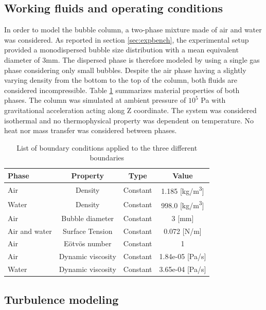 \documentclass[11pt,a4paper]{article}
\begin{document}
\subsection{Working fluids and operating conditions}
\label{sub:fluids}
In order to model the bubble column, a two-phase mixture made of air and water was considered. As reported in section \ref{sec:expbench}, the experimental setup provided a monodispersed bubble size distribution with a mean equivalent diameter of 3mm. The dispersed phase is therefore modeled by using a single gas phase considering only small bubbles. Despite the air phase having a slightly varying density from the bottom to the top of the column, both fluids are considered incompressible. Table \ref{tab:materials} summarizes material properties of both phases. The column was simulated at ambient pressure of $10^5$ Pa with gravitational acceleration acting along Z coordinate. The system was considered isothermal and no thermophysical property was dependent on temperature. No heat nor mass transfer was considered between phases.

\begin{table}[H]
  \centering
    \begin{tabular}{|p{7em} c c c|}
    \hline
    \rowcolor{bluePoli!40}
    \textbf{Phase} & \textbf{Property} & \textbf{Type} & \textbf{Value} \T\B \\
     \hline \hline 
    Air & Density & Constant & 1.185 [kg/m\textsuperscript{3}] \T\B \\
    Water & Density & Constant & 998.0 [kg/m\textsuperscript{3}] \T\B \\
    Air & Bubble diameter & Constant & 3 [mm] \T\B \\  
    Air and water & Surface Tension & Constant & 0.072 [N/m] \T\B \\   
    Air & E{ö}tv{ö}s number & Constant & 1    \T\B \\ 
    Air & Dynamic viscosity & Constant & 1.84e-05 [Pa/s]    \T\B \\ 
    Water & Dynamic viscosity & Constant & 3.65e-04 [Pa/s]    \T\B \\ 
    \hline
    \end{tabular}%
  \caption{List of boundary conditions applied to the three different boundaries}
  \label{tab:materials}%
\end{table}%



\subsection{Turbulence modeling}
\label{sub:turbmodels}
\end{document}
